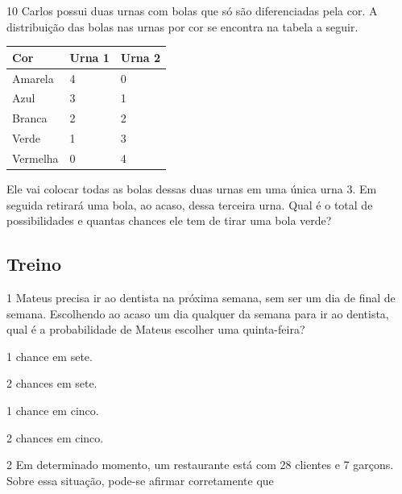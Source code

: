 \begin{mdframed}[linewidth=2pt,linecolor=salmao,roundcorner=2pt]
\begin{escolha}
\begin{mdframed}[linewidth=2pt,linecolor=salmao,roundcorner=2pt]


\end{mdframed}


\num{10} Carlos possui duas urnas com bolas que só são diferenciadas pela cor. A
distribuição das bolas nas urnas por cor se encontra na tabela a
seguir.

\begin{longtable}[]{@{}lll@{}}
\toprule
Cor & Urna 1 & Urna 2\tabularnewline
\midrule
\endhead
Amarela & 4 & 0\tabularnewline
Azul & 3 & 1\tabularnewline
Branca & 2 & 2\tabularnewline
Verde & 1 & 3\tabularnewline
Vermelha & 0 & 4\tabularnewline
\bottomrule
\end{longtable}

Ele vai colocar todas as bolas dessas duas urnas em uma única urna 3. Em
seguida retirará uma bola, ao acaso, dessa terceira urna. Qual é o total de possibilidades e quantas chances ele tem de tirar uma bola verde?

\begin{mdframed}[linewidth=2pt,linecolor=salmao,roundcorner=2pt]

\end{mdframed}


\subsection{Treino}

\num{1} Mateus precisa ir ao dentista na próxima semana, sem ser um dia de final de semana. Escolhendo ao acaso um dia
qualquer da semana para ir ao dentista, qual é a probabilidade de Mateus
escolher uma quinta-feira?

\begin{escolha}
\item
  1 chance em sete.
\item
  2 chances em sete.
\item
  1 chance em cinco.
\item
  2 chances em cinco.
\end{escolha}


\num{2} Em determinado momento, um restaurante está com 28 clientes e 7
garçons. Sobre essa situação, pode-se afirmar corretamente que


\end{escolha}
\end{mdframed}

